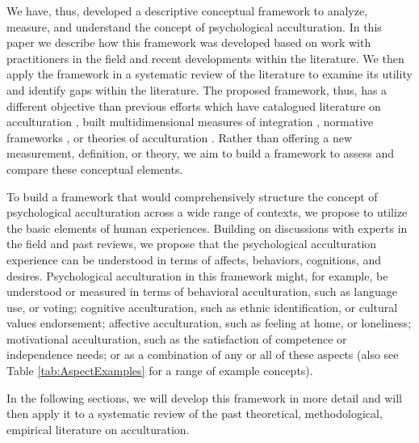 \documentclass[man, 12pt, a4paper, mask]{apa7}
\begin{document}
We have, thus, developed a descriptive conceptual framework to analyze, measure, and understand the concept of psychological acculturation. In this paper we describe how this framework was developed based on work with practitioners in the field and recent developments within the literature. We then apply the framework in a systematic review of the literature to examine its utility and identify gaps within the literature. The proposed framework, thus, has a different objective than previous efforts which have catalogued literature on acculturation \citep[e.g.,][]{Castels2003}, built multidimensional measures of integration \citep[e.g.,][]{Harder2018}, normative frameworks \citep[e.g.,][]{Ager2008a}, or theories of acculturation \citep[e.g.,][]{Berry2005}. Rather than offering a new measurement, definition, or theory, we aim to build a framework to assess and compare these conceptual elements. 

To build a framework that would comprehensively structure the concept of psychological acculturation across a wide range of contexts, we propose to utilize the basic elements of human experiences.
Building on discussions with experts in the field and past reviews, we propose that the psychological acculturation experience can be understood in terms of affects, behaviors, cognitions, and desires. Psychological acculturation in this framework might, for example, be understood or measured in terms of behavioral acculturation, such as language use, or voting; cognitive acculturation, such as ethnic identification, or cultural values endorsement; affective acculturation, such as feeling at home, or loneliness; motivational acculturation, such as the satisfaction of competence or independence needs; or as a combination of any or all of these aspects (also see Table \ref{tab:AspectExamples} for a range of example concepts). 

In the following sections, we will develop this framework in more detail and will then apply it to a systematic review of the past theoretical, methodological, empirical literature on acculturation.


\end{document}
